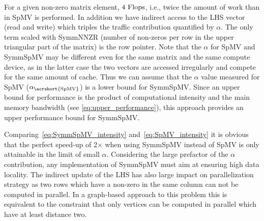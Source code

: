 For a given non-zero matrix element, $4~\mbox{Flops}$, i.e., twice the amount of work than in \acrshort{SpMV} is performed. In addition we have indirect access to the LHS vector (read and write) which triples the traffic contribution quantified by $\alpha$\@. The only term scaled with \acrshort{SymmNNZR} (number of non-zeros per row in the upper triangular part of the matrix) is the row pointer. Note that the $\alpha$ for \acrshort{SpMV} and \acrshort{SymmSpMV} may be different even for the same matrix and the same compute device, as in the latter case the two vectors are accessed irregularly and compete for the same amount of cache. Thus we can assume that the $\alpha$ value measured for \acrshort{SpMV} ($\alpha_\mathrm{\acrshort{SpMV}}$) is a lower bound for \acrshort{SymmSpMV}. Since an upper bound for performance is the product of computational intensity and the main memory bandwidth (see \cref{eq:upper_performance}), this approach provides an upper performance bound for \acrshort{SymmSpMV}.

Comparing~\cref{eq:SymmSpMV_intensity} and~\cref{eq:SpMV_intensity} it is obvious that the perfect speed-up of 2$\times$ when using \acrshort{SymmSpMV} instead of \acrshort{SpMV} is only attainable in the limit of small $\alpha$\@. %
Considering the large prefactor of the $\alpha$ contribution, any implementation of \acrshort{SymmSpMV} must aim at ensuring high data locality. The indirect update of the LHS has also large impact on parallelization strategy as two rows which have a non-zero in the same column can not be computed in parallel. In a graph-based approach to this problem this is equivalent to the constraint that only vertices can be computed in parallel which have at least distance two.


